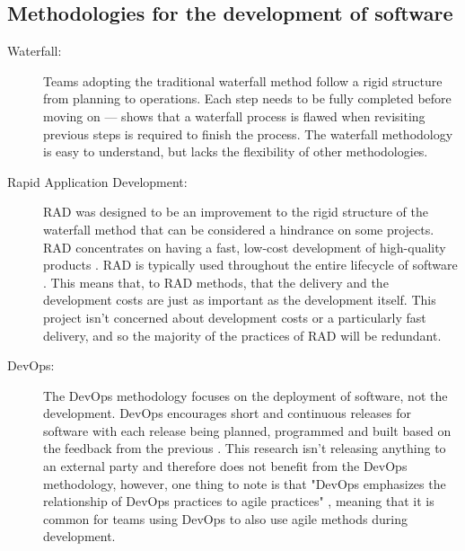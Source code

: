 \documentclass[11pt, a4paper]{report}
\begin{document}
\cleardoublepage
\begin{appendices}
\makeatletter
{}
\makeatother

\chapter{Methodologies for the development of software}
\label{appendix:softwareDevelopmentMethodologies}

\begin{description}

  \item[Waterfall:] Teams adopting the traditional waterfall method follow a rigid structure from planning to operations. Each step needs to be fully completed before moving on --- \citeauthor{royce1987managing} \parencite*[330]{royce1987managing} shows that a waterfall process is flawed when revisiting previous steps is required to finish the process. The waterfall methodology is easy to understand, but lacks the flexibility of other methodologies.
   
  \item[Rapid Application Development:] RAD was designed to be an improvement to the rigid structure of the waterfall method that can be considered a hindrance on some projects. RAD concentrates on having a fast, low-cost development of high-quality products \parencite{martin1991rapid}. RAD is typically used throughout the entire lifecycle of software \parencite[211]{beynon1999rapid}. This means that, to RAD methods, that the delivery and the development costs are just as important as the development itself. This project isn't concerned about development costs or a particularly fast delivery, and so the majority of the practices of RAD will be redundant.
   
  \item[DevOps:] The DevOps methodology focuses on the deployment of software, not the development. DevOps encourages short and continuous releases for software with each release being planned, programmed and built based on the feedback from the previous \parencite{bass2015devops}. This research isn't releasing anything to an external party and therefore does not benefit from the DevOps methodology, however, one thing to note is that "DevOps emphasizes the relationship of DevOps practices to agile practices" \parencite[15]{bass2015devops}, meaning that it is common for teams using DevOps to also use agile methods during development.


\end{description}
\end{appendices}
\end{document}

